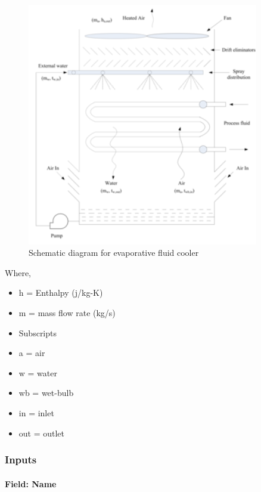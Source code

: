 \begin{figure}[hbtp] %
\centering
\includegraphics[width=0.9\textwidth, height=0.9\textheight, keepaspectratio=true]{media/image201.png}
\caption{Schematic diagram for evaporative fluid cooler \protect \label{fig:schematic-diagram-for-evaporative-fluid}}
\end{figure}

Where,

\begin{itemize}
\item
  h = Enthalpy (j/kg-K)
\item
  m = mass flow rate (kg/s)
\item
  Subscripts
\item
  a = air
\item
  w = water
\item
  wb = wet-bulb
\item
  in = inlet
\item
  out = outlet
\end{itemize}

\subsubsection{Inputs}\label{inputs-6-004}

\paragraph{Field: Name}\label{field-name-5-005}

